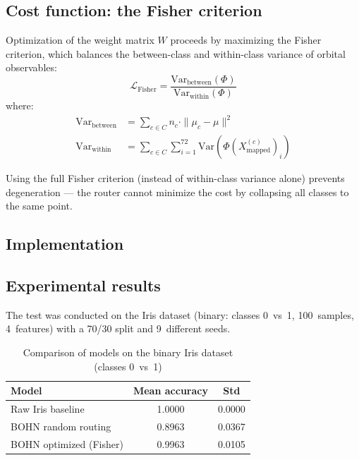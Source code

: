 \documentclass[11pt,a4paper]{report}
\begin{document}
\subsection{Cost function: the Fisher criterion}

Optimization of the weight matrix $W$ proceeds by maximizing the Fisher criterion, which balances the between-class and within-class variance of orbital observables:
\begin{equation}
    \mathcal{L}_{\text{Fisher}} = \frac{\text{Var}_{\text{between}}(\Phi)}{\text{Var}_{\text{within}}(\Phi)}
\end{equation}
where:
\begin{align}
    \text{Var}_{\text{between}} &= \sum_{c \in C} n_c \cdot \|\mu_c - \mu\|^2 \\
    \text{Var}_{\text{within}} &= \sum_{c \in C} \sum_{i=1}^{72} \text{Var}\left(\Phi(X_{\text{mapped}}^{(c)})_i\right)
\end{align}

Using the full Fisher criterion (instead of within-class variance alone) prevents degeneration --- the router cannot minimize the cost by collapsing all classes to the same point.

\subsection{Implementation}

\noindent{}


\subsection{Experimental results}

The test was conducted on the Iris dataset (binary: classes 0~vs~1, 100~samples, 4~features) with a 70/30 split and 9~different seeds.

\noindent{}


\begin{table}[H]
\centering
\caption{Comparison of models on the binary Iris dataset (classes 0~vs~1)}
\begin{tabular}{lcc}
\toprule
\textbf{Model} & \textbf{Mean accuracy} & \textbf{Std} \\
\midrule
Raw Iris baseline & 1.0000 & 0.0000 \\
BOHN random routing & 0.8963 & 0.0367 \\
BOHN optimized (Fisher) & 0.9963 & 0.0105 \\
\bottomrule
\end{tabular}
\end{table}
\end{document}
